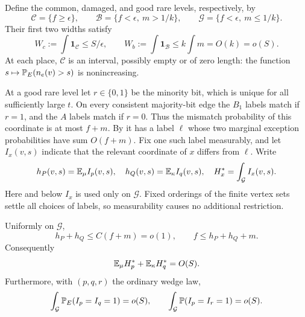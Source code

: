 Define the common, damaged, and good rare levels, respectively, by
\[
 \mathcal C=\{f\ge\epsilon\},\qquad
 \mathcal B=\{f<\epsilon,\ m>1/k\},\qquad
 \mathcal G=\{f<\epsilon,\ m\le1/k\}.
\]
Their first two widths satisfy
\begin{equation}\label{bud:widths}
 W_c:=\int\mathbf1_{\mathcal C}\le S/\epsilon,
 \qquad W_b:=\int\mathbf1_{\mathcal B}\le k\int m=O(k)=o(S).
\end{equation}
At each place, $\mathcal C$ is an interval, possibly empty or of zero
length: the function $s\mapsto\mathbb P_E(n_e(v)>s)$ is nonincreasing.

At a good rare level let $r\in\{0,1\}$ be the minority bit, which is
unique for all sufficiently large $t$.  On every consistent
majority-bit edge the $B_1$ labels match if $r=1$, and the $A$ labels
match if $r=0$.  Thus the mismatch probability of this coordinate is
at most $f+m$.  By  it has a label $\ell$ whose two
marginal exception probabilities have sum $O(f+m)$.  Fix one such
label measurably, and let $I_x(v,s)$ indicate that the relevant
coordinate of $x$ differs from $\ell$.  Write
\[
 h_P(v,s)=\mathbb E_\mu I_p(v,s),\quad
 h_Q(v,s)=\mathbb E_\kappa I_q(v,s),\quad
 H_x^*=\int_{\mathcal G} I_x(v,s).
\]
Here and below $I_x$ is used only on $\mathcal G$.  Fixed orderings of
the finite vertex sets settle all choices of labels, so measurability
causes no additional restriction.

\begin{lemma}\label{bud:rare-moments}
Uniformly on $\mathcal G$,
\begin{equation}\label{bud:exception-comparison}
 h_P+h_Q\le C(f+m)=o(1),\qquad f\le h_P+h_Q+m.
\end{equation}
Consequently
\begin{equation}\label{bud:first-moments}
 \mathbb E_\mu H_p^*+\mathbb E_\kappa H_q^*=O(S).
\end{equation}
Furthermore, with $(p,q,r)$ the ordinary wedge law,
\begin{equation}\label{bud:joint-exceptions}
 \int_{\mathcal G}\mathbb P_E(I_p=I_q=1)=o(S),\qquad
 \int_{\mathcal G}\mathbb P(I_p=I_r=1)=o(S).
\end{equation}
\end{lemma}

